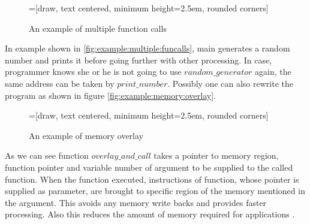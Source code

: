 \begin{figure}[htbp]
    \centering
    =[draw, text centered, minimum height=2.5em, rounded corners]
   \caption{An example of multiple function calls}
   \label{fig:example:multiple:funcalls}
\end{figure}


In example shown in \autoref{fig:example:multiple:funcalls}, main generates a random number and prints it before going further with other processing. In case, programmer knows she or he is not going to use $random\_generator$ again, the same address can be taken by $print\_number$. Possibly one can also rewrite the program as shown in figure \autoref{fig:example:memory:overlay}.

\begin{figure}[htbp]
    \centering
    =[draw, text centered, minimum height=2.5em, rounded corners]
   \caption{An example of memory overlay}
   \label{fig:example:memory:overlay}
\end{figure}

As we can see function $overlay\_and\_call$ takes a pointer to memory region, function pointer and variable number of argument to be supplied to the called function. When the function executed, instructions of function, whose pointer is supplied as parameter, are brought to specific region of the memory mentioned in the argument. This avoids any memory write backs and provides faster processing. Also this reduces the amount of memory required for applications \cite{verma2004dynamic}.

